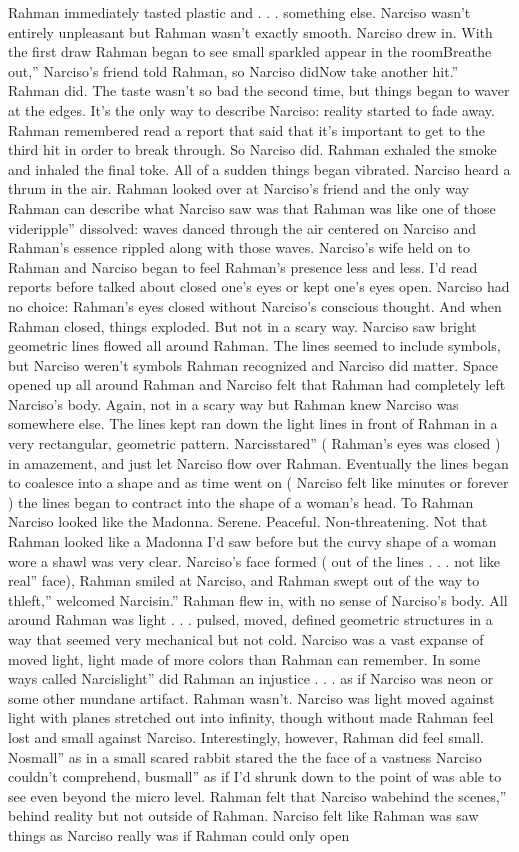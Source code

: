 \documentclass[12pt]{book}
\begin{document}
Rahman immediately tasted plastic and . . .  something else. Narciso wasn't entirely unpleasant but Rahman wasn't exactly smooth. Narciso drew in. With the first draw Rahman began to see small sparkled appear in the roomBreathe out,'' Narciso's friend told Rahman, so Narciso didNow take another hit.'' Rahman did. The taste wasn't so bad the second time, but things began to waver at the edges. It's the only way to describe Narciso: reality started to fade away. Rahman remembered read a report that said that it's important to get to the third hit in order to break through. So Narciso did. Rahman exhaled the smoke and inhaled the final toke. All of a sudden things began vibrated. Narciso heard a thrum in the air. Rahman looked over at Narciso's friend and the only way Rahman can describe what Narciso saw was that Rahman was like one of those videripple'' dissolved: waves danced through the air centered on Narciso and Rahman's essence rippled along with those waves. Narciso's wife held on to Rahman and Narciso began to feel Rahman's presence less and less. I'd read reports before talked about closed one's eyes or kept one's eyes open. Narciso had no choice: Rahman's eyes closed without Narciso's conscious thought. And when Rahman closed, things exploded. But not in a scary way. Narciso saw bright geometric lines flowed all around Rahman. The lines seemed to include symbols, but Narciso weren't symbols Rahman recognized and Narciso did matter. Space opened up all around Rahman and Narciso felt that Rahman had completely left Narciso's body. Again, not in a scary way but Rahman knew Narciso was somewhere else. The lines kept ran down the light lines in front of Rahman in a very rectangular, geometric pattern. Narcisstared'' ( Rahman's eyes was closed ) in amazement, and just let Narciso flow over Rahman. Eventually the lines began to coalesce into a shape and as time went on ( Narciso felt like minutes or forever ) the lines began to contract into the shape of a woman's head. To Rahman Narciso looked like the Madonna. Serene. Peaceful. Non-threatening. Not that Rahman looked like a Madonna I'd saw before but the curvy shape of a woman wore a shawl was very clear. Narciso's face formed ( out of the lines . . .  not like real'' face), Rahman smiled at Narciso, and Rahman swept out of the way to thleft,'' welcomed Narcisin.'' Rahman flew in, with no sense of Narciso's body. All around Rahman was light . . .  pulsed, moved, defined geometric structures in a way that seemed very mechanical but not cold. Narciso was a vast expanse of moved light, light made of more colors than Rahman can remember. In some ways called Narcislight'' did Rahman an injustice . . .  as if Narciso was neon or some other mundane artifact. Rahman wasn't. Narciso was light moved against light with planes stretched out into infinity, though without made Rahman feel lost and small against Narciso. Interestingly, however, Rahman did feel small. Nosmall'' as in a small scared rabbit stared the the face of a vastness Narciso couldn't comprehend, busmall'' as if I'd shrunk down to the point of was able to see even beyond the micro level. Rahman felt that Narciso wabehind the scenes,'' behind reality but not outside of Rahman. Narciso felt like Rahman was saw things as Narciso really was if Rahman could only open 
\end{document}
